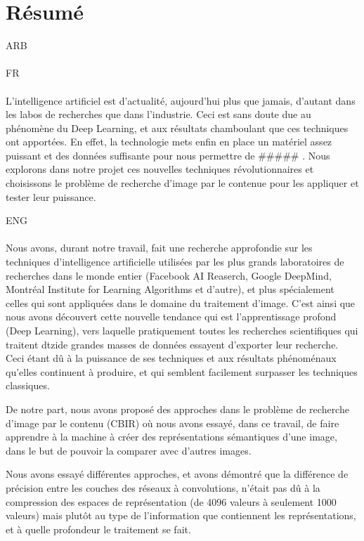 
\chapter*{Résumé} %

ARB\\\\

FR\\\\
L'intelligence artificiel est d’actualité, aujourd'hui plus que jamais, d'autant dans les labos de recherches que dans l'industrie. Ceci est sans doute due au phénomène du Deep Learning, et aux résultats chamboulant que ces techniques ont apportées. En effet, la technologie mets enfin en place un matériel assez puissant et des données suffisante pour nous permettre de ##### . Nous explorons dans notre projet ces nouvelles techniques révolutionnaires et choisissons le problème de recherche d'image par le contenue pour les appliquer et tester leur puissance.


ENG\\\\


Nous avons, durant notre travail, fait une recherche approfondie sur les techniques d'intelligence artificielle utilisées par les plus grands laboratoires de recherches dans le monde entier (Facebook AI Reaserch, Google DeepMind, Montréal Institute for Learning Algorithms et d'autre), et plus spécialement celles qui sont appliquées dans le domaine du traitement d'image. C'est ainsi que nous avons découvert cette nouvelle tendance qui est l'apprentissage profond (Deep Learning), vers laquelle pratiquement toutes les recherches scientifiques qui traitent dtzide grandes masses de données essayent d'exporter leur recherche. Ceci étant dû à la puissance de ses techniques et aux résultats phénoménaux qu'elles continuent à produire, et qui semblent facilement surpasser les techniques classiques.

	De notre part, nous avons proposé des approches dans le problème de recherche d'image par le contenu (CBIR) où nous avons essayé, dans ce travail, de faire apprendre à la machine à créer des représentations sémantiques d'une image, dans le but de pouvoir la comparer avec d'autres images.

	Nous avons essayé différentes approches, et avons démontré que la différence de précision entre les couches des réseaux à convolutions, n’était pas dû à la compression des espaces de représentation (de 4096 valeurs à seulement 1000 valeurs) mais plutôt au type de l'information que contiennent les représentations, et à quelle profondeur le traitement se fait. 

